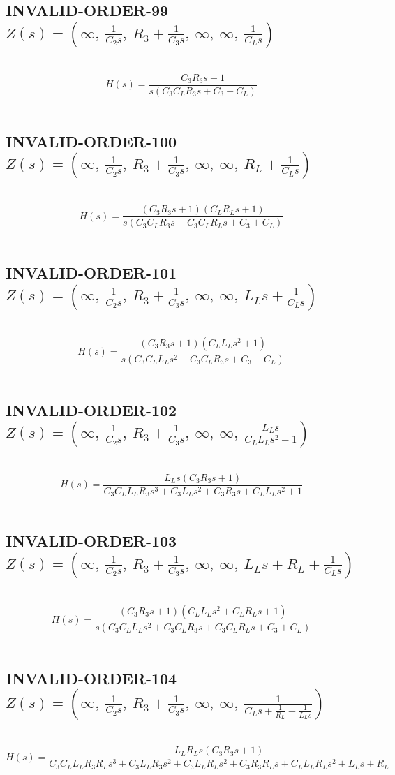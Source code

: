 \documentclass{article}
\begin{document}
\subsection{INVALID-ORDER-99 $Z(s) = \left( \infty, \  \frac{1}{C_{2} s}, \  R_{3} + \frac{1}{C_{3} s}, \  \infty, \  \infty, \  \frac{1}{C_{L} s}\right)$ } \ 
\textbf{\[H(s) = \frac{C_{3} R_{3} s + 1}{s \left(C_{3} C_{L} R_{3} s + C_{3} + C_{L}\right)}\] } \ 
\subsection{INVALID-ORDER-100 $Z(s) = \left( \infty, \  \frac{1}{C_{2} s}, \  R_{3} + \frac{1}{C_{3} s}, \  \infty, \  \infty, \  R_{L} + \frac{1}{C_{L} s}\right)$ } \ 
\textbf{\[H(s) = \frac{\left(C_{3} R_{3} s + 1\right) \left(C_{L} R_{L} s + 1\right)}{s \left(C_{3} C_{L} R_{3} s + C_{3} C_{L} R_{L} s + C_{3} + C_{L}\right)}\] } \ 
\subsection{INVALID-ORDER-101 $Z(s) = \left( \infty, \  \frac{1}{C_{2} s}, \  R_{3} + \frac{1}{C_{3} s}, \  \infty, \  \infty, \  L_{L} s + \frac{1}{C_{L} s}\right)$ } \ 
\textbf{\[H(s) = \frac{\left(C_{3} R_{3} s + 1\right) \left(C_{L} L_{L} s^{2} + 1\right)}{s \left(C_{3} C_{L} L_{L} s^{2} + C_{3} C_{L} R_{3} s + C_{3} + C_{L}\right)}\] } \ 
\subsection{INVALID-ORDER-102 $Z(s) = \left( \infty, \  \frac{1}{C_{2} s}, \  R_{3} + \frac{1}{C_{3} s}, \  \infty, \  \infty, \  \frac{L_{L} s}{C_{L} L_{L} s^{2} + 1}\right)$ } \ 
\textbf{\[H(s) = \frac{L_{L} s \left(C_{3} R_{3} s + 1\right)}{C_{3} C_{L} L_{L} R_{3} s^{3} + C_{3} L_{L} s^{2} + C_{3} R_{3} s + C_{L} L_{L} s^{2} + 1}\] } \ 
\subsection{INVALID-ORDER-103 $Z(s) = \left( \infty, \  \frac{1}{C_{2} s}, \  R_{3} + \frac{1}{C_{3} s}, \  \infty, \  \infty, \  L_{L} s + R_{L} + \frac{1}{C_{L} s}\right)$ } \ 
\textbf{\[H(s) = \frac{\left(C_{3} R_{3} s + 1\right) \left(C_{L} L_{L} s^{2} + C_{L} R_{L} s + 1\right)}{s \left(C_{3} C_{L} L_{L} s^{2} + C_{3} C_{L} R_{3} s + C_{3} C_{L} R_{L} s + C_{3} + C_{L}\right)}\] } \ 
\subsection{INVALID-ORDER-104 $Z(s) = \left( \infty, \  \frac{1}{C_{2} s}, \  R_{3} + \frac{1}{C_{3} s}, \  \infty, \  \infty, \  \frac{1}{C_{L} s + \frac{1}{R_{L}} + \frac{1}{L_{L} s}}\right)$ } \ 
\textbf{\[H(s) = \frac{L_{L} R_{L} s \left(C_{3} R_{3} s + 1\right)}{C_{3} C_{L} L_{L} R_{3} R_{L} s^{3} + C_{3} L_{L} R_{3} s^{2} + C_{3} L_{L} R_{L} s^{2} + C_{3} R_{3} R_{L} s + C_{L} L_{L} R_{L} s^{2} + L_{L} s + R_{L}}\] } \ 
\end{document}
